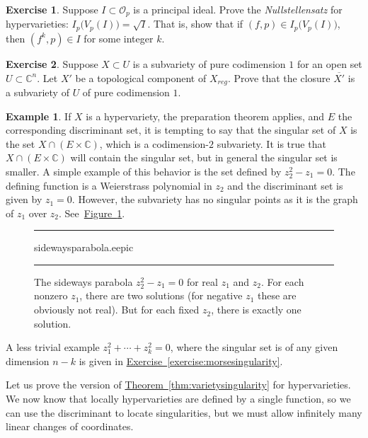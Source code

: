 \documentclass[12pt,openany]{book}
\newcommand{\C}{{\mathbb{C}}}
\newcommand{\sO}{{\mathscr{O}}}
\newcommand{\myindex}[1]{#1\index{#1}}
\theoremstyle{plain}
\theoremstyle{remark}
\theoremstyle{definition}
\newenvironment{exbox}{%
    \def\FrameCommand{\vrule width 1pt \relax\hspace{10pt}}%
    \MakeFramed{\advance\hsize-\width\FrameRestore}%
}{%
    \endMakeFramed
}
\newenvironment{myfig}{%
\begin{figure}[h!t]
\noindent\rule{\textwidth}{0.5pt}\vspace{12pt}\par\centering}%
{\par\noindent\rule{\textwidth}{0.5pt}
\end{figure}}
\theoremstyle{exercise}
\newtheorem{exercise}{Exercise}[section]
\theoremstyle{example}
\newtheorem{example}[thm]{Example}
\newcommand{\figureref}[1]{\hyperref[#1]{Figure~\ref*{#1}}}
\newcommand{\exerciseref}[1]{\hyperref[#1]{Exercise~\ref*{#1}}}
\newcommand{\thmref}[1]{\hyperref[#1]{Theorem~\ref*{#1}}}
\begin{document}
\begin{exbox}
\begin{exercise}
Suppose $I \subset \sO_p$ is a principal ideal.
Prove the
\emph{\myindex{Nullstellensatz}} for hypervarieties:
$I_p\bigl(V_p(I)\bigr) = \sqrt{I}$.  That is, show that if
$(f,p) \in I_p\bigl(V_p(I)\bigr)$, then $(f^k,p) \in I$ for some integer $k$.
\end{exercise}

\begin{exercise}
Suppose $X \subset U$ is a subvariety of pure codimension $1$ for an open set $U \subset \C^n$.
Let $X'$ be a topological component of $X_{\textit{reg}}$.  Prove that the
closure $\overline{X'}$ is a subvariety of $U$ of pure codimension $1$.
\end{exercise}
\end{exbox}

\begin{example} \label{example:discriminantnotsingset}
If $X$ is a hypervariety, 
the preparation theorem applies, and $E$ the corresponding discriminant set,
it is tempting to say that the singular set of $X$ is the
set $X \cap (E \times \C)$, which is a codimension-$2$ subvariety.  It is true that
$X \cap (E \times \C)$ will contain the singular set, but in general the
singular set is smaller.
A simple example of this behavior is the set defined by
$z_2^2 - z_1 = 0$.  The defining function is a Weierstrass
polynomial in $z_2$ and the discriminant set is given by $z_1 = 0$.
However, the subvariety has no singular points as it is the graph of $z_1$
over $z_2$.  See~\figureref{fig:sidewaysparabola}.

\begin{myfig}
\medskip
{sidewaysparabola.eepic}
\bigskip
\caption{The sideways parabola $z_2^2-z_1=0$ for real $z_1$ and $z_2$.
For each nonzero $z_1$, there are two solutions (for negative $z_1$ these
are obviously not real).  But for each fixed $z_2$, there is exactly
one solution.\label{fig:sidewaysparabola}}
\end{myfig}

A less trivial example $z_1^2+\cdots+z_k^2=0$,
where the singular set is of any given dimension $n-k$
is given in
\exerciseref{exercise:morsesingularity}.
\end{example}

Let us prove the version of \thmref{thm:varietysingularity} for
hypervarieties.
We now know that locally hypervarieties are defined by a single function,
so we can use the discriminant to locate singularities, but we must allow
infinitely many linear changes of coordinates.
\end{document}
